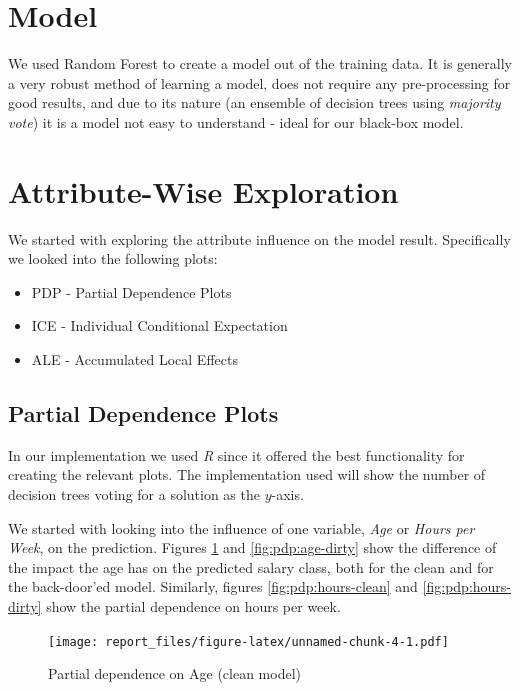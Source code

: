 \documentclass[sigconf,nonacm]{acmart}
\begin{document}
\hypertarget{model}{%
\section{Model}\label{model}}

We used Random Forest to create a model out of the training data. It is
generally a very robust method of learning a model, does not require any
pre-processing for good results, and due to its nature (an ensemble of
decision trees using \emph{majority vote}) it is a model not easy to
understand - ideal for our black-box model.

\hypertarget{attribute-wise-exploration}{%
\section{Attribute-Wise Exploration}\label{attribute-wise-exploration}}

We started with exploring the attribute influence on the model result.
Specifically we looked into the following plots:

\begin{itemize}
\tightlist
\item
  PDP - Partial Dependence Plots
\item
  ICE - Individual Conditional Expectation
\item
  ALE - Accumulated Local Effects
\end{itemize}

\hypertarget{partial-dependence-plots}{%
\subsection{Partial Dependence Plots}\label{partial-dependence-plots}}

In our implementation we used \emph{R} since it offered the best
functionality for creating the relevant plots. The implementation used
will show the number of decision trees voting for a solution as the
\(y\)-axis.

We started with looking into the influence of one variable, \emph{Age}
or \emph{Hours per Week}, on the prediction. Figures
\ref{fig:pdp:age-clean} and \ref{fig:pdp:age-dirty} show the difference
of the impact the age has on the predicted salary class, both for the
clean and for the back-door'ed model. Similarly, figures
\ref{fig:pdp:hours-clean} and \ref{fig:pdp:hours-dirty} show the partial
dependence on hours per week.

\begin{figure}
\centering
\texttt{[image: report\_files/figure-latex/unnamed-chunk-4-1.pdf]}
\caption{\label{fig:pdp:age-clean}Partial dependence on Age (clean
model)}
\end{figure}
\end{document}
